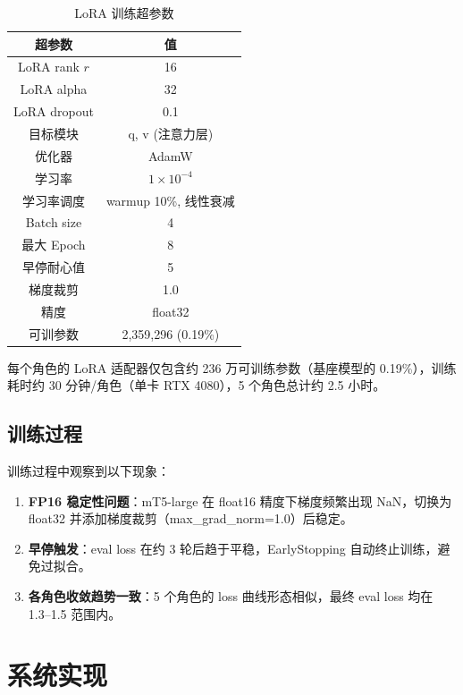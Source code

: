 \documentclass[12pt,a4paper]{article}
\begin{document}
\begin{table}[H]
\centering
\caption{LoRA 训练超参数}
\label{tab:hyperparams}
\begin{tabular}{c|c}
\toprule
超参数 & 值 \\
\midrule
LoRA rank $r$      & 16 \\
LoRA alpha         & 32 \\
LoRA dropout       & 0.1 \\
目标模块            & q, v (注意力层) \\
优化器              & AdamW \\
学习率              & $1\times10^{-4}$ \\
学习率调度          & warmup 10\%, 线性衰减 \\
Batch size         & 4 \\
最大 Epoch          & 8 \\
早停耐心值          & 5 \\
梯度裁剪            & 1.0 \\
精度                & float32 \\
可训参数            & 2,359,296 (0.19\%) \\
\bottomrule
\end{tabular}
\end{table}

每个角色的 LoRA 适配器仅包含约 236 万可训练参数（基座模型的 0.19\%），训练耗时约 30 分钟/角色（单卡 RTX 4080），5 个角色总计约 2.5 小时。

\subsection{训练过程}

训练过程中观察到以下现象：

\begin{enumerate}[leftmargin=2em]
    \item \textbf{FP16 稳定性问题}：mT5-large 在 float16 精度下梯度频繁出现 NaN，切换为 float32 并添加梯度裁剪（max\_grad\_norm=1.0）后稳定。
    \item \textbf{早停触发}：eval loss 在约 3 轮后趋于平稳，EarlyStopping 自动终止训练，避免过拟合。
    \item \textbf{各角色收敛趋势一致}：5 个角色的 loss 曲线形态相似，最终 eval loss 均在 1.3--1.5 范围内。
\end{enumerate}

\section{系统实现}
\end{document}
